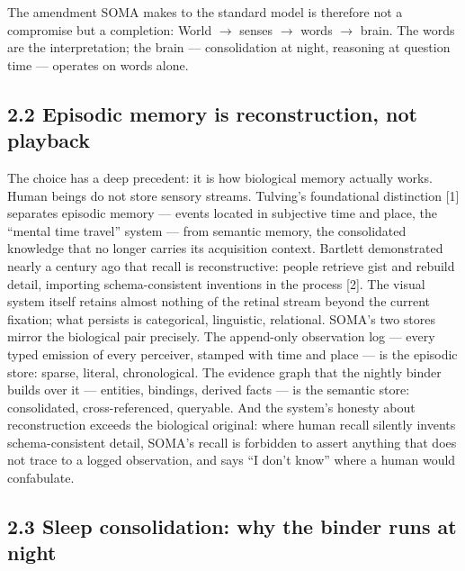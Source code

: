 The amendment SOMA makes to the standard model is therefore not a compromise but a completion: World \(\rightarrow\) senses \(\rightarrow\) words \(\rightarrow\) brain. The words are the interpretation; the brain --- consolidation at night, reasoning at question time --- operates on words alone.

\subsection{2.2 Episodic memory is reconstruction, not playback}\label{episodic-memory-is-reconstruction-not-playback}

The choice has a deep precedent: it is how biological memory actually works. Human beings do not store sensory streams. Tulving's foundational distinction {[}1{]} separates episodic memory --- events located in subjective time and place, the ``mental time travel'' system --- from semantic memory, the consolidated knowledge that no longer carries its acquisition context. Bartlett demonstrated nearly a century ago that recall is reconstructive: people retrieve gist and rebuild detail, importing schema-consistent inventions in the process {[}2{]}. The visual system itself retains almost nothing of the retinal stream beyond the current fixation; what persists is categorical, linguistic, relational. SOMA's two stores mirror the biological pair precisely. The append-only observation log --- every typed emission of every perceiver, stamped with time and place --- is the episodic store: sparse, literal, chronological. The evidence graph that the nightly binder builds over it --- entities, bindings, derived facts --- is the semantic store: consolidated, cross-referenced, queryable. And the system's honesty about reconstruction exceeds the biological original: where human recall silently invents schema-consistent detail, SOMA's recall is forbidden to assert anything that does not trace to a logged observation, and says ``I don't know'' where a human would confabulate.

\subsection{2.3 Sleep consolidation: why the binder runs at night}\label{sleep-consolidation-why-the-binder-runs-at-night}

